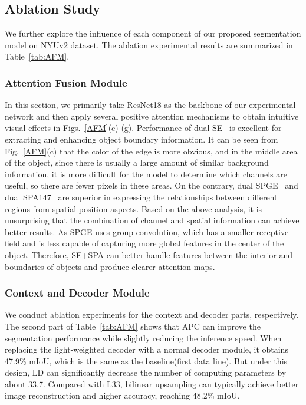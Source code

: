 \documentclass[journal,twoside,web]{ieeecolor}
\begin{document}
\subsection{Ablation Study}\label{sec:Ablation}
We further explore the influence of each component of our proposed segmentation model on NYUv2 dataset. The ablation experimental results are summarized in Table~\ref{tab:AFM}. 

\subsubsection{Attention Fusion Module} In this section, we primarily take ResNet18 as the backbone of our experimental network and then apply several positive attention mechanisms to obtain intuitive visual effects in Figs.~\ref{AFM}(c)-(g).
Performance of dual SE~\cite{SENet} is excellent for extracting and enhancing object boundary information. It can be seen from Fig.~\ref{AFM}(c) that the color of the edge is more obvious, and in the middle area of the object, since there is usually a large amount of similar background information, it is more difficult for the model to determine which channels are useful, so there are fewer pixels in these areas. On the contrary, dual SPGE~\cite{SpatialGE} and dual SPA147~\cite{spa} are superior in expressing the relationships between different regions from spatial position aspects. 
Based on the above analysis, it is unsurprising that the combination of channel and spatial information can achieve better results. As SPGE uses group convolution, which has a smaller receptive field and is less capable of capturing more global features in the center of the object. Therefore, SE+SPA can better handle features between the interior and boundaries of objects and produce clearer attention maps.


\subsubsection{Context and Decoder Module}
We conduct ablation experiments for the context and decoder parts, respectively. The second part of Table~\ref{tab:AFM} shows that APC can improve the segmentation performance while slightly reducing the inference speed. When replacing the light-weighted decoder with a normal decoder module, it obtains 47.9\% mIoU, which is the same as the baseline(first data line). But under this design, LD can significantly decrease the number of computing parameters by about 33.7. Compared with L33, bilinear upsampling can typically achieve better image reconstruction and higher accuracy, reaching 48.2\% mIoU.
\end{document}
